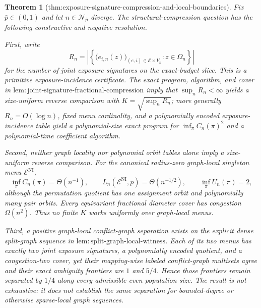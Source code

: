 \documentclass{article}
\newtheorem{theorem}{Theorem}
\begin{document}
\begin{theorem}[thm:exposure-signature-compression-and-local-boundaries]\label{thm:exposure-signature-compression-and-local-boundaries}
Fix \(\bar p\in(0,1)\) and let \(n\in\mathcal N_{\bar p}\) diverge. The structural-compression question has the following constructive and negative resolution.

First, write
\[
 R_n=\left|\left\{\bigl(e_{i,n}(z)\bigr)_{(e,i)\in\mathcal E\times V_n}:z\in\Omega_n\right\}\right|
\]
for the number of joint exposure signatures on the exact-budget slice. This is a primitive exposure-incidence certificate. The exact program, algorithm, and cover in \(\mathrm{lem{:}joint\text{-}signature\text{-}fractional\text{-}compression}\) imply that \(\sup_nR_n<\infty\) yields a size-uniform reverse comparison with \(K=\sqrt{\sup_nR_n}\); more generally \(R_n=O(\log n)\), fixed menu cardinality, and a polynomially encoded exposure-incidence table yield a polynomial-size exact program for \(\inf_\pi C_n(\pi)^2\) and a polynomial-time coefficient algorithm.

Second, neither graph locality nor polynomial orbit tables alone imply a size-uniform reverse comparison. For the canonical radius-zero graph-local singleton menu \(\mathcal E^{\mathrm{NI}}\),
\[
 \inf_\pi C_n(\pi)=\Theta(n^{-1}),
 \qquad
 L_n(\mathcal E^{\mathrm{NI}},\bar p)=\Theta(n^{-1/2}),
 \qquad
 \inf_\pi U_n(\pi)=2, \tag{1}
\]
although the permutation quotient has one assignment orbit and polynomially many pair orbits. Every equivariant fractional diameter cover has congestion \(\Omega(n^2)\). Thus no finite \(K\) works uniformly over graph-local menus.

Third, a positive graph-local conflict-graph separation exists on the explicit dense split-graph sequence in \(\mathrm{lem{:}split\text{-}graph\text{-}local\text{-}witness}\). Each of its two menus has exactly two joint exposure signatures, a polynomially encoded quotient, and a congestion-two cover, yet their mapping-wise labeled conflict-graph multisets agree and their exact ambiguity frontiers are \(1\) and \(5/4\). Hence those frontiers remain separated by \(1/4\) along every admissible even population size. The result is not exhaustive: it does not establish the same separation for bounded-degree or otherwise sparse-local graph sequences.
\end{theorem}
\end{document}
